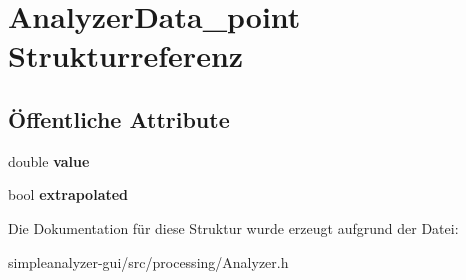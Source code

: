 \hypertarget{structAnalyzerData__point}{\section{Analyzer\-Data\-\_\-point Strukturreferenz}
\label{structAnalyzerData__point}
}
\subsection*{Öffentliche Attribute}
\begin{DoxyCompactItemize}
\item 
\hypertarget{structAnalyzerData__point_a9d91020954e9fa29a831b83e18c7c245}{double {\bfseries value}}\label{structAnalyzerData__point_a9d91020954e9fa29a831b83e18c7c245}

\item 
\hypertarget{structAnalyzerData__point_a933796e194e5d607e1e1d07e15ab04e5}{bool {\bfseries extrapolated}}\label{structAnalyzerData__point_a933796e194e5d607e1e1d07e15ab04e5}

\end{DoxyCompactItemize}


Die Dokumentation für diese Struktur wurde erzeugt aufgrund der Datei\-:\begin{DoxyCompactItemize}
\item 
simpleanalyzer-\/gui/src/processing/Analyzer.\-h\end{DoxyCompactItemize}
